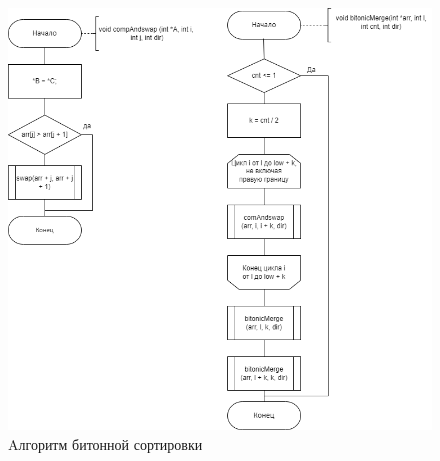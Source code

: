 \begin{figure}[h]
	\begin{center}
		\includegraphics[scale=0.6]{img/bitonic_sort_1.png}
	\end{center}
	\captionsetup{justification=centering}
	\caption{Aлгоритм битонной сортировки}
	\label{img:bitonic_sort_1}
\end{figure}
\clearpage
